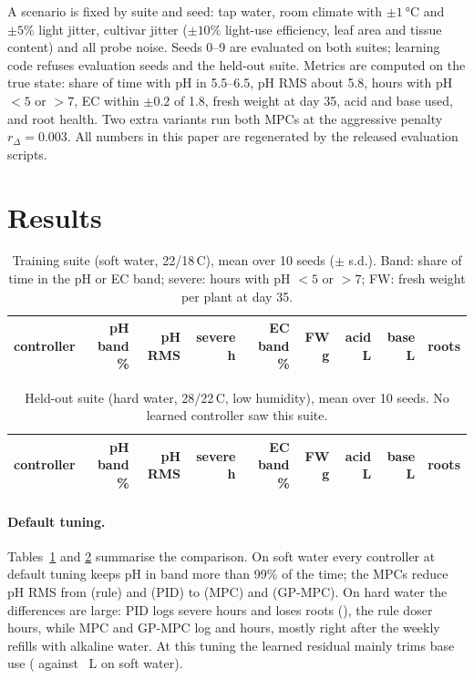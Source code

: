 \documentclass[11pt]{article}
\begin{document}
A scenario is fixed by suite and seed: tap water, room climate with $\pm\SI{1}{\celsius}$ and $\pm5\%$ light jitter, cultivar jitter ($\pm10\%$ light-use efficiency, leaf area and tissue content) and all probe noise. Seeds 0--9 are evaluated on both suites; learning code refuses evaluation seeds and the held-out suite. Metrics are computed on the true state: share of time with pH in 5.5--6.5, pH RMS about 5.8, hours with pH $<5$ or $>7$, EC within $\pm0.2$ of 1.8, fresh weight at day 35, acid and base used, and root health. Two extra variants run both MPCs at the aggressive penalty $r_\Delta = 0.003$. All numbers in this paper are regenerated by the released evaluation scripts.

\section{Results}\label{sec:results}

\begin{table}[t]
\centering
\caption{Training suite (soft water, 22/18\,\textdegree C), mean over 10 seeds ($\pm$ s.d.). Band: share of time in the pH or EC band; severe: hours with pH $<5$ or $>7$; FW: fresh weight per plant at day 35.}\label{tab:train}
\small
\begin{tabular}{lrrrrrrrr}
\toprule
controller & pH band \% & pH RMS & severe h & EC band \% & FW g & acid L & base L & roots\\
\midrule

\bottomrule
\end{tabular}
\end{table}

\begin{table}[t]
\centering
\caption{Held-out suite (hard water, 28/22\,\textdegree C, low humidity), mean over 10 seeds. No learned controller saw this suite.}\label{tab:unseen}
\small
\begin{tabular}{lrrrrrrrr}
\toprule
controller & pH band \% & pH RMS & severe h & EC band \% & FW g & acid L & base L & roots\\
\midrule

\bottomrule
\end{tabular}
\end{table}

\paragraph{Default tuning.} Tables~\ref{tab:train} and \ref{tab:unseen} summarise the comparison. On soft water every controller at default tuning keeps pH in band more than 99\% of the time; the MPCs reduce pH RMS from \nRuleTrRms{} (rule) and \nPidTrRms{} (PID) to \nMpcTrRms{} (MPC) and \nGpTrRms{} (GP-MPC). On hard water the differences are large: PID logs \nPidUnSevere{} severe hours and loses roots (\nPidUnRoot{}), the rule doser \nRuleUnSevere{} hours, while MPC and GP-MPC log \nMpcUnSevere{} and \nGpUnSevere{} hours, mostly right after the weekly refills with alkaline water. At this tuning the learned residual mainly trims base use (\nGpTrBase{} against \nMpcTrBase{}~L on soft water).
\end{document}
